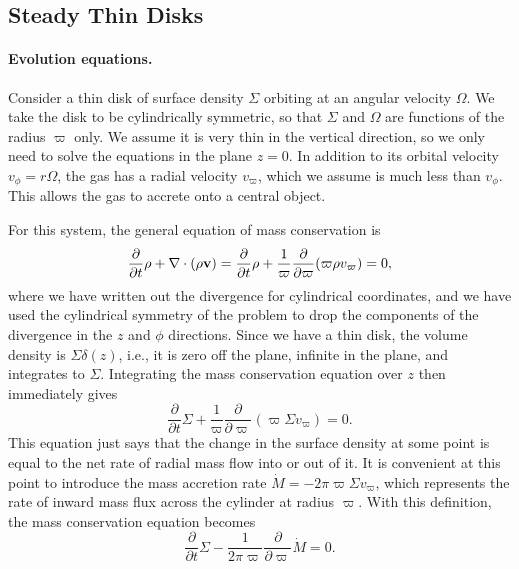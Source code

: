 \subsection{Steady Thin Disks}

\paragraph{Evolution equations.}

Consider a thin disk of surface density $\Sigma$ orbiting at an angular velocity $\Omega$. We take the disk to be cylindrically symmetric, so that $\Sigma$ and $\Omega$ are functions of the radius $\varpi$ only. We assume it is very thin in the vertical direction, so we only need to solve the equations in the plane $z=0$. In addition to its orbital velocity $v_{\phi}=r\Omega$, the gas has a radial velocity $v_\varpi$, which we assume is much less than $v_{\phi}$. This allows the gas to accrete onto a central object.

For this system, the general equation of mass conservation is
\begin{equation}
\frac{\partial}{\partial t}\rho + \nabla\cdot(\rho \mathbf{v}) = \frac{\partial}{\partial t}\rho + \frac{1}{\varpi} \frac{\partial}{\partial \varpi}(\varpi \rho v_\varpi) = 0,
\end{equation}
where we have written out the divergence for cylindrical coordinates, and we have used the cylindrical symmetry of the problem to drop the components of the divergence in the $z$ and $\phi$ directions. Since we have a thin disk, the volume density is $\Sigma \delta(z)$, i.e., it is zero off the plane, infinite in the plane, and integrates to $\Sigma$. Integrating the mass conservation equation over $z$ then immediately gives
\begin{equation}
\frac{\partial}{\partial t}\Sigma + \frac{1}{\varpi} \frac{\partial}{\partial \varpi}(\varpi \Sigma v_\varpi) = 0.
\end{equation}
This equation just says that the change in the surface density at some point is equal to the net rate of radial mass flow into or out of it. It is convenient at this point to introduce the mass accretion rate $\dot{M}=-2\pi \varpi \Sigma v_\varpi$, which represents the rate of inward mass flux across the cylinder at radius $\varpi$. With this definition, the mass conservation equation becomes
\begin{equation}
\label{eq:continuity_disk}
\frac{\partial}{\partial t}\Sigma - \frac{1}{2\pi \varpi} \frac{\partial}{\partial \varpi}\dot{M} = 0.
\end{equation}

